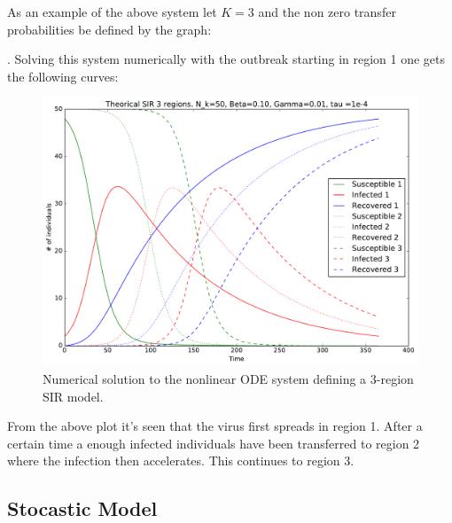 As an example of the above system let $K=3$ and the non zero transfer probabilities be defined by the graph:
\begin{figure}[H]
	\centering
{}
\end{figure}
. Solving this system numerically with the outbreak starting in region 1 one gets the following curves:
\begin{figure}[H]
	\centering
	\includegraphics[width= 1.0 \linewidth]{plots/sir_three_region.pdf}
	\caption{Numerical solution to the nonlinear ODE system defining a 3-region SIR model.}
\end{figure}

From the above plot it's seen that the virus first spreads in region 1. After a certain time a enough infected individuals have been transferred to region 2 where the infection then accelerates. This continues to region 3.

\subsection{}

\subsection{Stocastic Model}


